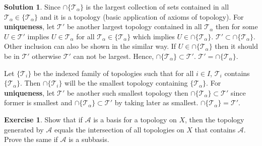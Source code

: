 \documentclass[12pt,reqno]{amsart}
\theoremstyle{plain}
\theoremstyle{definition}
\newtheorem{exer}{Exercise}
\newtheorem*{sol*}{Solution}
\newcommand{\cal}[1]{\mathcal{#1}}
\begin{document}
\begin{sol*}
    Since $\cap\{\cal T_\alpha\}$ is the largest collection of sets contained in all $\cal T_\alpha \in \{\cal T_\alpha\}$ and it is a topology (basic application of axioms of topology). For {\bf uniqueness}, let $\cal T'$ be another largest topology contained in all $\cal T_\alpha$ then for some $U \in \cal T'$ implies $U \in \cal T_\alpha$ for all $\cal T_\alpha \in \{\cal T_\alpha\}$ which implies $U \in \cap \{\cal T_\alpha\}$. $\cal T' \subset \cap \{\cal T_\alpha\}$. Other inclusion can also be shown in the similar way. If $U \in \cap\{\cal T_\alpha\}$ then it should be in $\cal T'$ otherwise $\cal T'$ can not be largest. Hence, $\cap\{\cal T_\alpha\} \subset \cal T'$. $\cal T' = \cap\{\cal T_\alpha\}$.

    Let $\{\cal T_i\}$ be the indexed family of topologies such that for all $i \in I$, $\cal T_i$ contains $\{\cal T_\alpha\}$. Then $\cap \{\cal T_i\}$ will be the smallest topology containing $\{\cal T_\alpha\}$. For {\bf uniqueness}, let $\cal T'$ be another such smallest topology then $\cap \{\cal T_\alpha\} \subset \cal T'$ since former is smallest and $\cap \{\cal T_\alpha\} \subset \cal T'$ by taking later as smallest. $\cap \{\cal T_\alpha\} = \cal T'$.
\end{sol*}
\begin{exer}
    Show that if $\cal A$ is a basis for a topology on $X$, then the topology generated by $\cal A$ equals the intersection of all topologies on $X$ that contains $\cal A$. Prove the same if $\cal A$ is a subbasis.
\end{exer}
\end{document}
